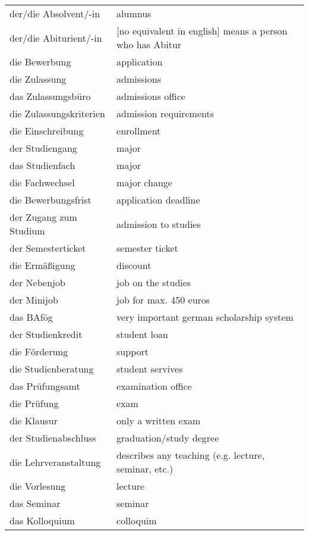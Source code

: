 \documentclass[12pt]{article}
\begin{document}
\begin{table}
\begin{tabular}{l | l}
    der/die Absolvent/-in   & alumnus \\
    der/die Abiturient/-in  & [no equivalent in english] means a person who has Abitur \\
    die Bewerbung           & application\\
    die Zulassung           & admissions\\
    das Zulassungsb\"uro    & admissions office\\
    die Zulassungskriterien & admission requirements\\
    die Einschreibung       & enrollment\\
    der Studiengang         & major\\
    das Studienfach         & major\\
    die Fachwechsel         & major change\\
    die Bewerbungsfrist     & application deadline\\
    der Zugang zum Studium  & admission to studies\\
    der Semesterticket      & semester ticket\\
    die Erm\"a{\ss}igung    & discount\\
    der Nebenjob            & job on the studies\\
    der Minijob             & job for max. 450 euros\\
    das BAf\"og             & very important german scholarship system\\
    der Studienkredit       & student loan\\
    die F\"orderung         & support\\
    die Studienberatung     & student servives\\
    das Pr\"ufungsamt       & examination office\\
    die Pr\"ufung           & exam\\
    die Klausur             & only a written exam\\
    der Studienabschluss    & graduation/study degree\\ 
    die Lehrveranstaltung   & describes any teaching (e.g. lecture, seminar, etc.)\\
    die Vorlesung           & lecture\\
    das Seminar             & seminar\\
    das Kolloquium          & colloquim\\

\end{tabular}
\end{table}
\end{document}
